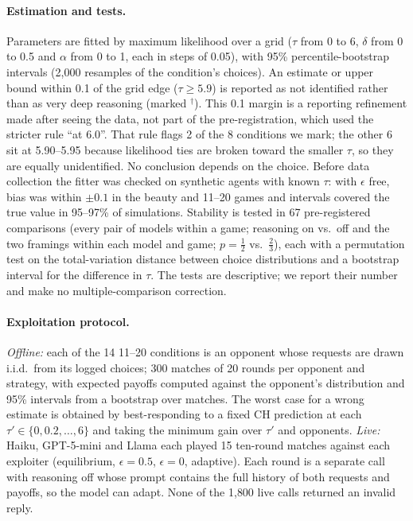 \documentclass[11pt]{article}
\begin{document}
\paragraph{Estimation and tests.} Parameters are fitted by maximum likelihood over a grid ($\tau$ from 0 to 6, $\delta$ from 0 to 0.5 and $\alpha$ from 0 to 1, each in steps of 0.05), with 95\% percentile-bootstrap intervals (2{,}000 resamples of the condition's choices). An estimate or upper bound within 0.1 of the grid edge ($\tau\ge5.9$) is reported as not identified rather than as very deep reasoning (marked $^\dagger$). This 0.1 margin is a reporting refinement made after seeing the data, not part of the pre-registration, which used the stricter rule ``at 6.0''. That rule flags 2 of the 8 conditions we mark; the other 6 sit at 5.90--5.95 because likelihood ties are broken toward the smaller $\tau$, so they are equally unidentified. No conclusion depends on the choice. Before data collection the fitter was checked on synthetic agents with known $\tau$: with $\epsilon$ free, bias was within $\pm0.1$ in the beauty and 11--20 games and intervals covered the true value in 95--97\% of simulations. Stability is tested in 67 pre-registered comparisons (every pair of models within a game; reasoning on vs.\ off and the two framings within each model and game; $p=\tfrac12$ vs.\ $\tfrac23$), each with a permutation test on the total-variation distance between choice distributions and a bootstrap interval for the difference in $\tau$. The tests are descriptive; we report their number and make no multiple-comparison correction.

\paragraph{Exploitation protocol.} \emph{Offline:} each of the 14 11--20 conditions is an opponent whose requests are drawn i.i.d.\ from its logged choices; 300 matches of 20 rounds per opponent and strategy, with expected payoffs computed against the opponent's distribution and 95\% intervals from a bootstrap over matches. The worst case for a wrong estimate is obtained by best-responding to a fixed CH prediction at each $\tau'\in\{0,0.2,\dots,6\}$ and taking the minimum gain over $\tau'$ and opponents. \emph{Live:} Haiku, GPT-5-mini and Llama each played 15 ten-round matches against each exploiter (equilibrium, $\epsilon=0.5$, $\epsilon=0$, adaptive). Each round is a separate call with reasoning off whose prompt contains the full history of both requests and payoffs, so the model can adapt. None of the 1{,}800 live calls returned an invalid reply.
\end{document}
